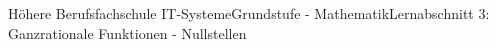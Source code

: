 \documentclass[11pt,oneside,openany,headings=optiontotoc,11pt,numbers=noenddot]{article}
\begin{document}
	\begin{worksheet}{Höhere Berufsfachschule IT-Systeme}{Grundstufe - Mathematik}{Lernabschnitt 3: Ganzrationale Funktionen - Nullstellen}
		\\
		
		\\
		
		\\
	\end{worksheet}
\end{document}

